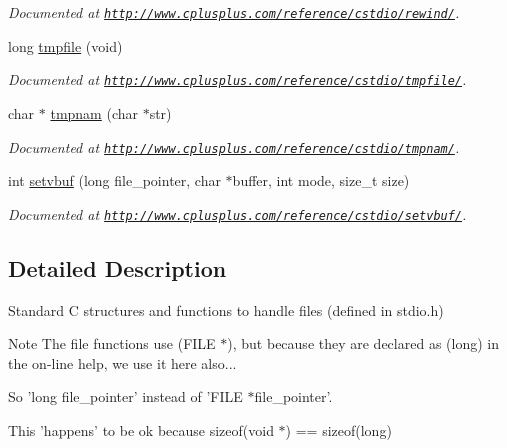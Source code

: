 \begin{DoxyCompactItemize}
\begin{DoxyCompactList}\small\item\em Documented at \href{http://www.cplusplus.com/reference/cstdio/rewind/}{\tt http\-://www.\-cplusplus.\-com/reference/cstdio/rewind/}. \end{DoxyCompactList}\item 
\hypertarget{group__file_gad888d1014ab55f0d19bd2ceb0fb4faa9}{long \hyperlink{group__file_gad888d1014ab55f0d19bd2ceb0fb4faa9}{tmpfile} (void)}\label{group__file_gad888d1014ab55f0d19bd2ceb0fb4faa9}

\begin{DoxyCompactList}\small\item\em Documented at \href{http://www.cplusplus.com/reference/cstdio/tmpfile/}{\tt http\-://www.\-cplusplus.\-com/reference/cstdio/tmpfile/}. \end{DoxyCompactList}\item 
\hypertarget{group__file_ga6152bfd9e570310dc1a0b23cbe04c975}{char $\ast$ \hyperlink{group__file_ga6152bfd9e570310dc1a0b23cbe04c975}{tmpnam} (char $\ast$str)}\label{group__file_ga6152bfd9e570310dc1a0b23cbe04c975}

\begin{DoxyCompactList}\small\item\em Documented at \href{http://www.cplusplus.com/reference/cstdio/tmpnam/}{\tt http\-://www.\-cplusplus.\-com/reference/cstdio/tmpnam/}. \end{DoxyCompactList}\item 
\hypertarget{group__file_ga290a37f3ed2896917c6d45573d340248}{int \hyperlink{group__file_ga290a37f3ed2896917c6d45573d340248}{setvbuf} (long file\-\_\-pointer, char $\ast$buffer, int mode, size\-\_\-t size)}\label{group__file_ga290a37f3ed2896917c6d45573d340248}

\begin{DoxyCompactList}\small\item\em Documented at \href{http://www.cplusplus.com/reference/cstdio/setvbuf/}{\tt http\-://www.\-cplusplus.\-com/reference/cstdio/setvbuf/}. \end{DoxyCompactList}\end{DoxyCompactItemize}


\subsection{Detailed Description}
Standard C structures and functions to handle files (defined in stdio.\-h) \begin{DoxyNote}{Note}
The file functions use (F\-I\-L\-E $\ast$), but because they are declared as (long) in the on-\/line help, we use it here also... \par
 So 'long file\-\_\-pointer' instead of 'F\-I\-L\-E $\ast$file\-\_\-pointer'. \par
This 'happens' to be ok because sizeof(void $\ast$) == sizeof(long) 
\end{DoxyNote}
